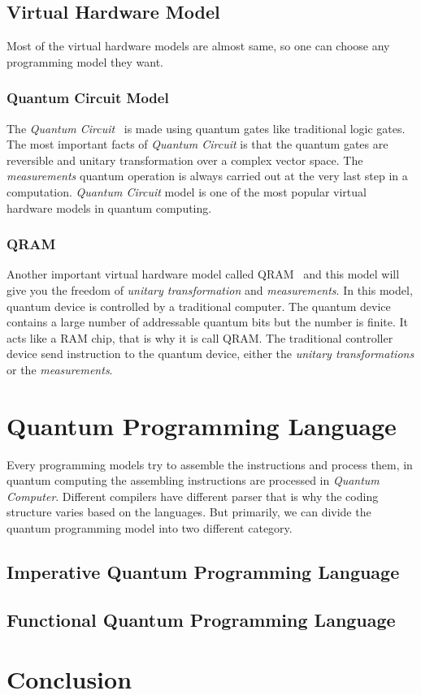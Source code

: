 \documentclass[11pt, conference, onecolumn]{IEEEtran}
\begin{document}
\subsection{Virtual Hardware Model}
Most of the virtual hardware models are almost same, so one can choose any programming model they want.

\subsubsection{Quantum Circuit Model}
The \textit{Quantum Circuit}~\cite{yao1993quantum} is made using quantum gates like traditional logic gates. The most important facts of \textit{Quantum Circuit} is that the quantum gates 
are reversible and unitary transformation over a complex vector space. The \textit{measurements} quantum operation is always carried out at the very last step in a computation. 
\textit{Quantum Circuit} model is one of the most popular virtual hardware models in quantum computing.

\subsubsection{QRAM}
Another important virtual hardware model called QRAM~\cite{knill1996conventions} and this model will give you the freedom of  \textit{unitary transformation} and \textit{measurements}. 
In this model, quantum device is controlled by a traditional computer. The quantum device contains a large number of addressable quantum bits but the number is finite. It acts like a 
RAM chip, that is why it is call QRAM. The traditional controller device send instruction to the quantum device, either the \textit{unitary transformations} or the \textit{measurements}.

\section{Quantum Programming Language}
Every programming models try to assemble the instructions and process them, in quantum computing the assembling instructions are processed in \textit{Quantum Computer}. Different compilers 
have different parser that is why the coding structure varies based on the languages. But primarily, we can divide the quantum programming model into two different category.  

\subsection{Imperative Quantum Programming Language}

\subsection{Functional Quantum Programming Language}

\section{Conclusion}



\end{document}

